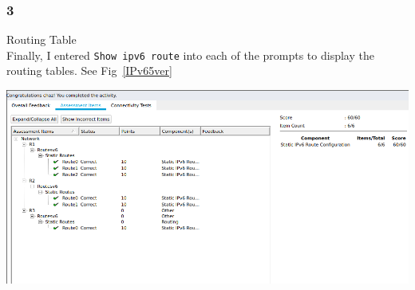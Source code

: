 \documentclass[../EngineeringJournal_CDavis.tex]{subfiles}
\begin{document}
\subsubsection{3}{Routing Table}
\\Finally, I entered \verb$Show ipv6 route$ into each of the prompts to display the
routing tables. See Fig~\ref{IPv65ver}

\clearpage

\begin{center}
	\includegraphics[scale=0.25]{Figures/2020-02-05-141927_993x479_scrot.png}
\end{center}

\end{document}
